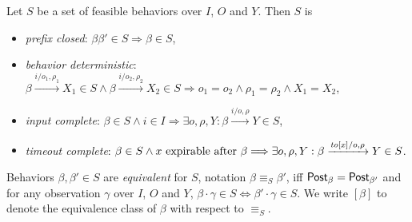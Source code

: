 \begin{definition}
Let $S$ be a set of feasible behaviors over $I$, $O$ and $Y$. Then $S$ is
\begin{itemize}
\item
\emph{prefix closed}: $\beta \beta' \in S \Longrightarrow \beta \in S$,
\item
\emph{behavior deterministic}:
$\beta \xrightarrow{i/o_1, \rho_1} X_1 \in S \wedge \beta \xrightarrow{i/o_2, \rho_2} X_2 \in S \Longrightarrow o_1 = o_2 \wedge \rho_1 = \rho_2 \wedge X_1 = X_2$,
\item
\emph{input complete}:
$\beta \in S \wedge i \in I \Longrightarrow \exists o, \rho, Y : \beta \xrightarrow{i/o, \rho} Y \in S$,
\item
\emph{timeout complete}:
$\beta \in S \wedge x \mbox{ expirable after } \beta \Longrightarrow
\exists o, \rho, Y: \beta \xrightarrow{\mathit{to}[x]/o, \rho} Y \in S$.
\end{itemize}
Behaviors $\beta, \beta' \in S$ are \emph{equivalent} for $S$, notation $\beta \equiv_S \beta'$, iff 
$\mathsf{Post}_{\beta} = \mathsf{Post}_{\beta'}$ and for any observation
$\gamma$ over $I$, $O$ and $Y$, $\beta \cdot \gamma \in S \Leftrightarrow \beta' \cdot \gamma \in S$.
We write $[\beta]$ to denote the equivalence class of $\beta$ with respect to $\equiv_S$.
\end{definition}

